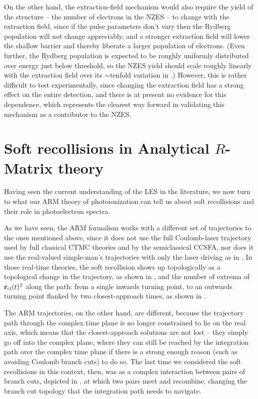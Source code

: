 On the other hand, the extraction-field mechanism would also require the yield of the structure -- the number of electrons in the NZES -- to change with the extraction field, since if the pulse parameters don't vary then the Rydberg population will not change appreciably, and a stronger extraction field will lower the shallow barrier and thereby liberate a larger population of electrons. (Even further, the Rydberg population is expected to be roughly uniformly distributed over energy just below threshold, so the NZES yield should scale roughly linearly with the extraction field over its $\sim$tenfold variation in .) However, this is rather difficult to test experimentally, since changing the extraction field has a strong effect on the entire detection, and there is at present no evidence for this dependence, which represents the clearest way forward in validating this mechanism as a contributor to the NZES.





\section[Soft recollisions in Analytical R-Matrix theory]{Soft recollisions in Analytical $R$-Matrix theory}
\label{sec:ARM-soft-recollisions}

Having seen the current understanding of the LES in the literature, we now turn to what our ARM theory of photoionization can tell us about soft recollisions and their role in photoelectron spectra. 

As we have seen, the ARM formalism works with a different set of trajectories to the ones mentioned above, since it does not use the full Coulomb-laser trajectory used by full classical CTMC theories and by the semiclassical CCSFA, nor does it use the real-valued simple-man's trajectories with only the laser driving as in . In those real-time theories, the soft recollision shows up topologically as a topological change in the trajectory, as shown in , and the number of extrema of $\vb{r}_{\mathrm{cl}}(t)^2$ along the path: from a single inwards turning point, to an outwards turning point flanked by two closest-approach times, as shown in .

The ARM trajectories, on the other hand, are different, because the trajectory path through the complex time plane is no longer constrained to lie on the real axis, which means that the closest-approach solutions are not lost -- they simply go off into the complex plane, where they can still be reached by the integration path over the complex time plane if there is a strong enough reason (such as avoiding Coulomb branch cuts) to do so. The last time we considered the soft recollisions in this context, then, was as a complex interaction between pairs of branch cuts, depicted in , at which two pairs meet and recombine, changing the branch cut topology that the integration path needs to navigate.



